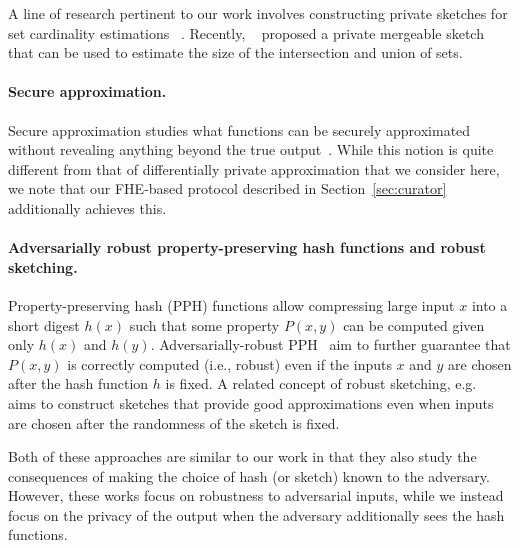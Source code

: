 A line of research pertinent to our work involves constructing private
sketches for set cardinality estimations
~\cite{stanojevic2017distributed,sparka2018p2kmv,nunez2020rrtxfm,kreuter2020privacy,pagh_et_al:LIPIcs.ICDT.2021.18}.
%
Recently, ~\cite{ICML:HehTinCor23}
proposed a private mergeable sketch that can be used to estimate the size of the
intersection and union of sets.  


\paragraph{Secure approximation.}
Secure approximation studies what functions can be securely approximated without revealing anything beyond the true output~\cite{ICALP:FIMNSW01,STOC:HKKN01}.  
While this notion is quite different from that of differentially private approximation that we consider here, we note that our FHE-based protocol described in Section~\ref{sec:curator} additionally achieves this.

\paragraph{Adversarially robust property-preserving
hash functions and robust sketching.} 
Property-preserving hash (PPH) functions allow compressing large input $x$ into a short digest $h(x)$ such that some property $P(x,y)$ can be computed given only $h(x)$ and $h(y)$.  Adversarially-robust PPH~\cite{itcs:BoyLavVai19,EC:FleSim21,EC:FleLarSim22,C:HLTW22} aim to further guarantee that $P(x,y)$ is correctly computed (i.e., robust) even if the inputs $x$ and $y$ are chosen after the hash function $h$ is fixed.  A related concept of robust sketching, e.g.~\cite{ITCS:ACSS23,JACM:BJWY22} aims to construct sketches that provide good approximations even when inputs are chosen after the randomness of the sketch is fixed.  

Both of these approaches are similar to our work in that they also study the consequences of making the choice of hash (or sketch) known to the adversary.  However, these works focus on robustness to adversarial inputs, while we instead focus on the privacy of the output when the adversary additionally sees the hash functions.  

